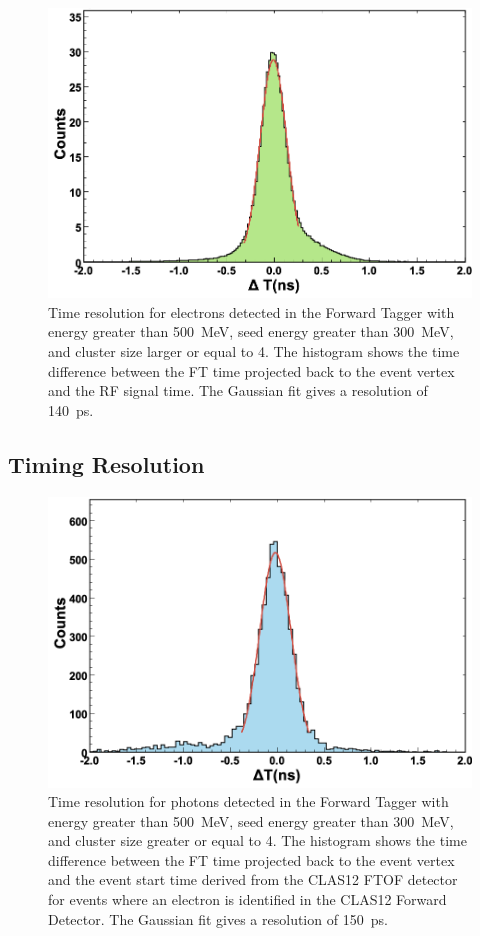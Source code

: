 \begin{figure}[h]
\includegraphics[height=0.6\columnwidth]{fig/ft_electron_time.png}
\caption{Time resolution for electrons detected in the Forward Tagger with energy greater than 500~MeV, seed
  energy greater than 300~MeV, and cluster size larger or equal to 4. The histogram shows the time difference
  between the FT time projected back to the event vertex and the RF signal time. The Gaussian fit gives a resolution
  of 140~ps. }
\label{fig:electron_time}
\end{figure}

\subsection{Timing Resolution}

\begin{figure}[h]
\includegraphics[height=0.6\columnwidth]{fig/ft_gamma_time.png}
\caption{Time resolution for photons detected in the Forward Tagger with energy greater than 500~MeV, seed
  energy greater than 300~MeV, and cluster size greater or equal to 4. The histogram shows the time difference
  between the FT time projected back to the event vertex and the event start time derived from the CLAS12 FTOF
  detector for events where an electron is identified in the CLAS12 Forward Detector. The Gaussian fit gives a
  resolution of 150~ps. }
\label{fig:gamma_time}
\end{figure}

